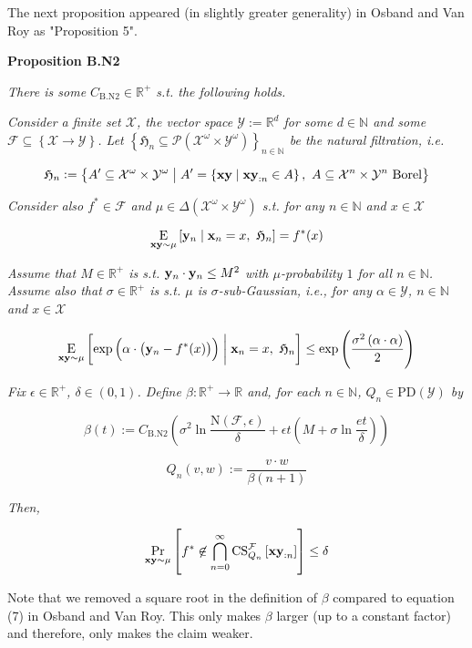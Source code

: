 \documentclass[a4paper]{article}
\newcommand{\Co}[1]{}
\newcommand{\AP}[1]{\left(#1\right)}
\newcommand{\AB}[1]{\left[#1\right]}
\newcommand{\AC}[1]{\left\{#1\right\}}
\newcommand{\ABM}[2]{\left[#1\;\middle\vert\;#2\right]}
\newcommand{\ACM}[2]{\left\{#1\;\middle\vert\;#2\right\}}
\newcommand{\Pa}[2]{\underset{#1}{\operatorname{Pr}}\AB{#2}}
\newcommand{\CE}[3]{\underset{#1}{\operatorname{E}}\ABM{#2}{#3}}
\newcommand{\PS}[1]{\mathcal{P}\AP{#1}}
\newcommand{\Nats}{\mathbb{N}}
\newcommand{\Reals}{\mathbb{R}}
\newcommand{\PD}{\mathrm{PD}}
\newcommand{\X}{\mathcal{X}}
\newcommand{\Y}{\mathcal{Y}}
\newcommand{\F}{\mathcal{F}}
\newcommand{\N}{\mathrm{N}}
\newcommand{\CS}{\mathrm{CS}}
\begin{document}
The next proposition appeared (in slightly greater generality) in Osband and Van Roy as "Proposition 5".

\textbf{Proposition B.N2}\Co{b}

\textit{There is some $C_{\mathrm{B.N2}}\in\Reals^+$ s.t. the following holds.}\Co{i}

\textit{Consider a finite set $\X$, the vector space $\Y:=\Reals^d$ for some $d\in\Nats$ and some $\F\subseteq\AC{\X\rightarrow\Y}$. Let $\AC{\mathfrak{H}_n\subseteq\PS{\X^\omega\times\Y^\omega}}_{n\in\Nats}$ be the natural filtration, i.e.}\Co{i}

$$\mathfrak{H}_n:=\ACM{A'\subseteq\X^\omega\times\Y^\omega}{A'=\ACM{\bold{xy}}{\bold{xy}_{:n}\in A},\ A\subseteq\X^n\times\Y^n\text{ Borel}}$$

\textit{Consider also $f^*\in\F$ and $\mu\in\Delta\AP{\X^\omega\times\Y^\omega}$ s.t. for any $n\in\Nats$ and $x\in\X$}\Co{i}

$$\CE{\bold{xy}\sim\mu}{\bold{y}_n}{\bold{x}_n=x,\ \mathfrak{H}_n} = f^*(x)$$

\textit{Assume that $M\in\Reals^+$ is s.t. $\bold{y}_n\cdot\bold{y}_n\leq M^2$ with $\mu$-probability $1$ for all $n\in\Nats$. Assume also that $\sigma\in\Reals^+$ is s.t. $\mu$ is $\sigma$-sub-Gaussian, i.e., for any $\alpha\in\Y$, $n\in\Nats$ and $x\in\X$}\Co{i}

$$\CE{\bold{xy}\sim\mu}{\exp\AP{\alpha\cdot\AP{\bold{y}_n-f^*(x)}}}{\bold{x}_n=x,\ \mathfrak{H}_n} \leq \exp\AP{\frac{\sigma^2\AP{\alpha\cdot\alpha}}{2}}$$

\textit{Fix $\epsilon\in\Reals^+$, $\delta\in(0,1)$. Define $\beta:\Reals^+\rightarrow\Reals$ and, for each $n\in\Nats$, $Q_n\in\PD(\Y)$ by}\Co{i}

$$\beta(t):=C_{\mathrm{B.N2}}\AP{\sigma^2 \ln{\frac{\N(\F,\epsilon)}{\delta}}+\epsilon t\AP{M+\sigma\ln{\frac{et}{\delta}}}}$$

$$Q_n(v,w):=\frac{v\cdot w}{\beta(n+1)}$$

\textit{Then,}\Co{i}

$$\Pa{\bold{xy}\sim\mu}{f^*\not\in\bigcap_{n=0}^\infty\CS^\F_{Q_n}\AB{\bold{xy}_{:n}}} \leq \delta$$

Note that we removed a square root in the definition of $\beta$ compared to equation (7) in Osband and Van Roy. This only makes $\beta$ larger (up to a constant factor) and therefore, only makes the claim weaker.
\end{document}
